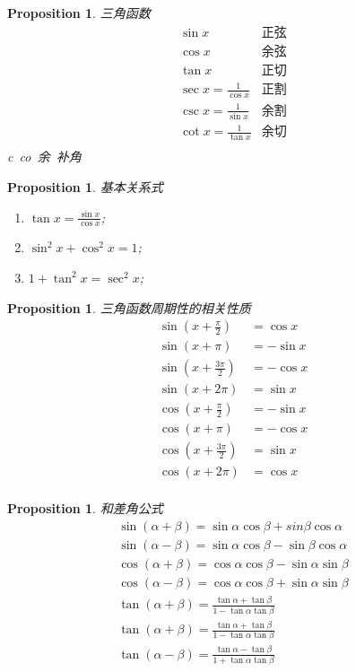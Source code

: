 \documentclass{article}
\newtheorem{proposition}[theorem]{Proposition}
\begin{document}
\begin{proposition}
\rm 三角函数
$$
\begin{array}{ll}
\sin x & \text{正弦} \\
\cos x & \text{余弦} \\
\tan x & \text{正切} \\
\sec x = \frac{1}{\cos x} & \text{正割} \\
\csc x = \frac{1}{\sin x} & \text{余割} \\
\cot x = \frac{1}{\tan x} & \text{余切} \\
\end{array}
$$
c~co~余~补角
\end{proposition}

\begin{proposition}
\rm 基本关系式
\begin{enumerate}
	\item $\tan x = \frac{\sin x}{\cos x}$;
	\item $\sin^2 x + \cos^2 x =1$;
	\item $1 + \tan^2 x = \sec^2 x$;
\end{enumerate}
\end{proposition}

\begin{proposition}
\rm 三角函数周期性的相关性质
$$
\begin{array}{ll}
\sin (x+\frac{\pi}{2}) &= \cos x \\
\sin (x+\pi) &= -\sin x \\
\sin (x+\frac{3\pi}{2}) &= -\cos x \\
\sin (x+2\pi) &= \sin x \\
\cos (x+\frac{\pi}{2}) &= -\sin x \\
\cos (x+\pi) &= -\cos x \\
\cos (x+\frac{3\pi}{2}) &= \sin x \\
\cos (x+2\pi) &= \cos x \\
\end{array}
$$
\end{proposition}

\begin{proposition}
\rm 和差角公式
$$
\begin{array}{ll}
\sin(\alpha + \beta) = \sin \alpha \cos \beta + sin \beta \cos \alpha \\
\sin(\alpha - \beta) = \sin \alpha \cos \beta - \sin \beta \cos \alpha \\
\cos(\alpha + \beta) = \cos \alpha \cos \beta - \sin \alpha \sin \beta \\
\cos(\alpha - \beta) = \cos \alpha \cos \beta + \sin \alpha \sin \beta \\
\tan(\alpha + \beta) = \frac{\tan \alpha + \tan \beta}{1-\tan\alpha\tan\beta} \\ 
\tan(\alpha + \beta) = \frac{\tan \alpha + \tan \beta}{1-\tan\alpha\tan\beta} \\
\tan(\alpha - \beta) = \frac{\tan \alpha - \tan \beta}{1+\tan\alpha\tan\beta}
\end{array}
$$
\end{proposition}
\end{document}

